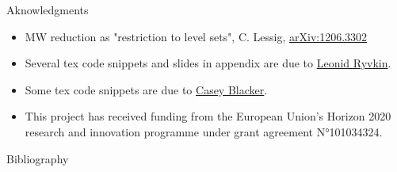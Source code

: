 \documentclass[beamer,10pt]{standalone}
\begin{document}


\begin{frame}[t,allowframebreaks]{Aknowledgments}
	\begin{itemize}[label=$\star$]
		\item MW reduction as "restriction to level sets", C. Lessig,
			\href{https://arxiv.org/abs/1206.3302}{arXiv:1206.3302}
		\item Several tex code snippets and slides in appendix are due to \href{https://www.ryvkin.eu/}{Leonid Ryvkin}.
		\item Some tex code snippets are due to \href{https://math.gmu.edu/~cblacke/}{Casey Blacker}.
		\item This project has received funding from the European
		Union’s Horizon 2020 research and innovation programme under grant
		agreement N°101034324.
		
	\end{itemize}
\end{frame}



\begin{frame}[t,allowframebreaks]{Bibliography}
	\nocite{Miti2025}
	\printbibliography
\end{frame}


\end{document}
